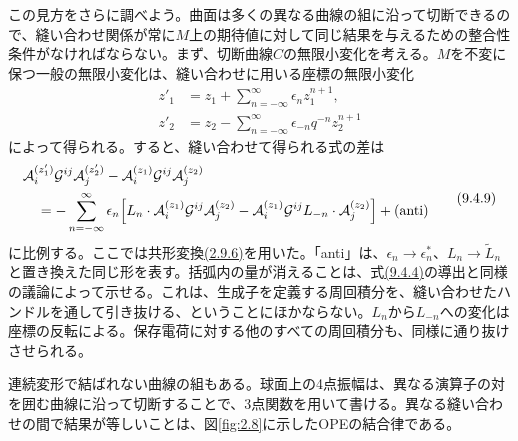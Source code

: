 この見方をさらに調べよう。曲面は多くの異なる曲線の組に沿って切断できるので、縫い合わせ関係が常に$M$上の期待値に対して同じ結果を与えるための整合性条件がなければならない。まず、切断曲線$C$の無限小変化を考える。$M$を不変に保つ一般の無限小変化は、縫い合わせに用いる座標の無限小変化
\begin{align}
 z'_1&=z_1+\sum_{n=-\infty}^{\infty}\epsilon_n z_1^{n+1},
 \tag{9.4.8a}\label{eq:9.4.8a}\\
 z'_2&=z_2-\sum_{n=-\infty}^{\infty}\epsilon_{-n}q^{-n}z_2^{n+1}
 \tag{9.4.8b}\label{eq:9.4.8b}
\end{align}
によって得られる。すると、縫い合わせて得られる式の差は
\begin{equation}
 \begin{aligned}
 &\mathcal A_i^{(z'_1)}\mathcal G^{ij}\mathcal A_j^{(z'_2)}
 -\mathcal A_i^{(z_1)}\mathcal G^{ij}\mathcal A_j^{(z_2)}\\
 &\quad=-\sum_{n=-\infty}^{\infty}\epsilon_n
 \Bigl[L_n\cdot\mathcal A_i^{(z_1)}\mathcal G^{ij}\mathcal A_j^{(z_2)}
 -\mathcal A_i^{(z_1)}\mathcal G^{ij}L_{-n}\cdot\mathcal A_j^{(z_2)}\Bigr]
 +(\mathrm{anti})
 \end{aligned}
 \tag{9.4.9}\label{eq:9.4.9}
\end{equation}
に比例する。ここでは共形変換\hyperref[eq:2.9.6]{(2.9.6)}を用いた。「anti」は、$\epsilon_n\to\epsilon_n^*$、$L_n\to\tilde L_n$と置き換えた同じ形を表す。括弧内の量が消えることは、式\hyperref[eq:9.4.4]{(9.4.4)}の導出と同様の議論によって示せる。これは、生成子を定義する周回積分を、縫い合わせたハンドルを通して引き抜ける、ということにほかならない。$L_n$から$L_{-n}$への変化は座標の反転による。保存電荷に対する他のすべての周回積分も、同様に通り抜けさせられる。

連続変形で結ばれない曲線の組もある。球面上の4点振幅は、異なる演算子の対を囲む曲線に沿って切断することで、3点関数を用いて書ける。異なる縫い合わせの間で結果が等しいことは、図\ref{fig:2.8}に示したOPEの結合律である。

